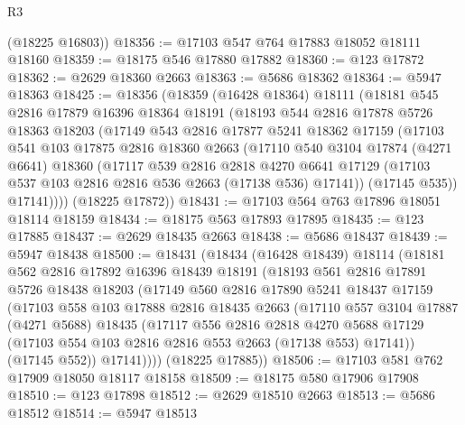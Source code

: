 \begin{lexlean}{R3}
\begin{coremodule}
      (@18225 @16803))
@18356 := @17103 @547 @764 @17883 @18052 @18111 @18160
@18359 := @18175 @546 @17880 @17882
@18360 := @123 @17872
@18362 := @2629 @18360 @2663
@18363 := @5686 @18362
@18364 := @5947 @18363
@18425 := @18356
    (@18359
      (@16428 @18364)
      @18111
      (@18181
        @545
        @2816
        @17879
        @16396
        @18364
        @18191
        (@18193
          @544
          @2816
          @17878
          @5726
          @18363
          @18203
          (@17149
            @543
            @2816
            @17877
            @5241
            @18362
            @17159
            (@17103
              @541
              @103
              @17875
              @2816
              @18360
              @2663
              (@17110
                @540
                @3104
                @17874
                (@4271 @6641)
                @18360
                (@17117
                  @539
                  @2816
                  @2818
                  @4270
                  @6641
                  @17129
                  (@17103 @537 @103 @2816 @2816 @536 @2663 (@17138 @536) @17141))
                (@17145 @535))
              @17141))))
      (@18225 @17872))
@18431 := @17103 @564 @763 @17896 @18051 @18114 @18159
@18434 := @18175 @563 @17893 @17895
@18435 := @123 @17885
@18437 := @2629 @18435 @2663
@18438 := @5686 @18437
@18439 := @5947 @18438
@18500 := @18431
    (@18434
      (@16428 @18439)
      @18114
      (@18181
        @562
        @2816
        @17892
        @16396
        @18439
        @18191
        (@18193
          @561
          @2816
          @17891
          @5726
          @18438
          @18203
          (@17149
            @560
            @2816
            @17890
            @5241
            @18437
            @17159
            (@17103
              @558
              @103
              @17888
              @2816
              @18435
              @2663
              (@17110
                @557
                @3104
                @17887
                (@4271 @5688)
                @18435
                (@17117
                  @556
                  @2816
                  @2818
                  @4270
                  @5688
                  @17129
                  (@17103 @554 @103 @2816 @2816 @553 @2663 (@17138 @553) @17141))
                (@17145 @552))
              @17141))))
      (@18225 @17885))
@18506 := @17103 @581 @762 @17909 @18050 @18117 @18158
@18509 := @18175 @580 @17906 @17908
@18510 := @123 @17898
@18512 := @2629 @18510 @2663
@18513 := @5686 @18512
@18514 := @5947 @18513

\end{coremodule}
\end{lexlean}
